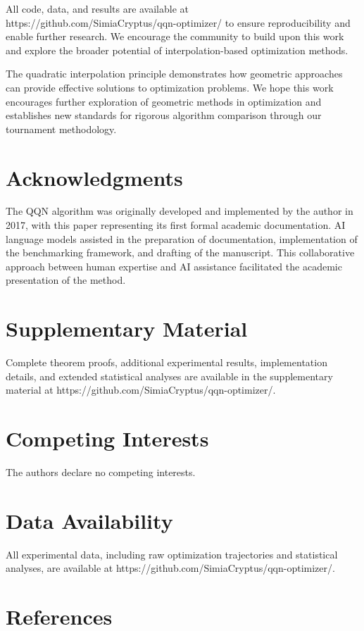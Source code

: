 All code, data, and results are available at https://github.com/SimiaCryptus/qqn-optimizer/ to ensure reproducibility and enable further research.
We encourage the community to build upon this work and explore the broader potential of interpolation-based optimization methods.

The quadratic interpolation principle demonstrates how geometric approaches can provide effective solutions to optimization problems.
We hope this work encourages further exploration of geometric methods in optimization and establishes new standards for rigorous algorithm comparison through our tournament methodology.

\hypertarget{acknowledgments}{%
\section{Acknowledgments}\label{acknowledgments}}

The QQN algorithm was originally developed and implemented by the author in 2017, with this paper representing its first formal academic documentation.
AI language models assisted in the preparation of documentation, implementation of the benchmarking framework, and drafting of the manuscript. This collaborative approach between human expertise and AI assistance facilitated the academic presentation of the method.

\hypertarget{supplementary-material}{%
\section{Supplementary Material}\label{supplementary-material}}

Complete theorem proofs, additional experimental results, implementation details, and extended statistical analyses are available in the supplementary material at https://github.com/SimiaCryptus/qqn-optimizer/.

\hypertarget{competing-interests}{%
\section{Competing Interests}\label{competing-interests}}

The authors declare no competing interests.

\hypertarget{data-availability}{%
\section{Data Availability}\label{data-availability}}

All experimental data, including raw optimization trajectories and statistical analyses, are available at https://github.com/SimiaCryptus/qqn-optimizer/.

\hypertarget{references}{%
\section{References}\label{references}}
